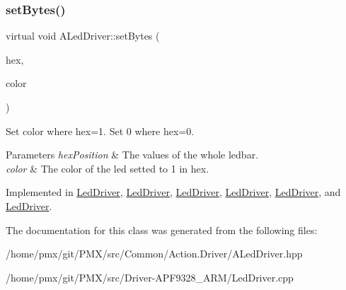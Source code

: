 \subsubsection{\texorpdfstring{set\+Bytes()}{setBytes()}}
{\footnotesize\ttfamily virtual void A\+Led\+Driver\+::set\+Bytes (\begin{DoxyParamCaption}\item[{uint}]{hex,  }\item[{Led\+Color}]{color }\end{DoxyParamCaption})\hspace{0.3cm}{\ttfamily [pure virtual]}}



Set color where hex=1. Set 0 where hex=0. 


\begin{DoxyParams}{Parameters}
{\em hex\+Position} & The values of the whole ledbar. \\
\hline
{\em color} & The color of the led setted to 1 in hex. \\
\hline
\end{DoxyParams}


Implemented in \hyperlink{classLedDriver_a765b8b642e13715ccaff1cbcff01dc97}{Led\+Driver}, \hyperlink{classLedDriver_a66512dd673a81681d3597e301af13759}{Led\+Driver}, \hyperlink{classLedDriver_a765b8b642e13715ccaff1cbcff01dc97}{Led\+Driver}, \hyperlink{classLedDriver_a765b8b642e13715ccaff1cbcff01dc97}{Led\+Driver}, \hyperlink{classLedDriver_a66512dd673a81681d3597e301af13759}{Led\+Driver}, and \hyperlink{classLedDriver_a66512dd673a81681d3597e301af13759}{Led\+Driver}.



The documentation for this class was generated from the following files\+:\begin{DoxyCompactItemize}
\item 
/home/pmx/git/\+P\+M\+X/src/\+Common/\+Action.\+Driver/A\+Led\+Driver.\+hpp\item 
/home/pmx/git/\+P\+M\+X/src/\+Driver-\/\+A\+P\+F9328\+\_\+\+A\+R\+M/Led\+Driver.\+cpp\end{DoxyCompactItemize}
